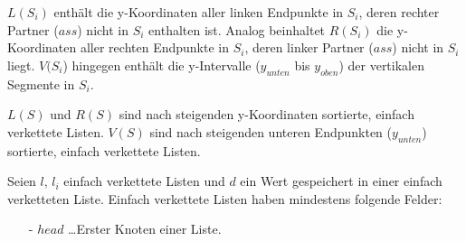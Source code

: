 \documentclass{article}
\begin{document}
$L(S_i)$ enth{\"a}lt die y-Koordinaten aller linken Endpunkte in $S_i$, deren
rechter Partner ($ass$) nicht in $S_i$ enthalten ist. Analog beinhaltet $R(S_i)$
die y-Koordinaten aller rechten Endpunkte in $S_i$, deren linker Partner ($ass$)
nicht in $S_i$ liegt. $V(S_i$) hingegen enth{\"a}lt die y-Intervalle ($y_{unten}$
bis $y_{oben}$) der vertikalen Segmente in $S_i$.

$L(S)$ und $R(S)$ sind nach steigenden y-Koordinaten sortierte, einfach verkettete
Listen. $V(S)$ sind nach steigenden unteren Endpunkten ($y_{unten}$) sortierte,
einfach verkettete Listen.

Seien $l$, $l_i$ einfach verkettete Listen und $d$ ein Wert gespeichert in einer
einfach verketteten Liste. Einfach verkettete Listen haben mindestens folgende
Felder:
\begin{itemize}
  \item[-] $head$ \ldots Erster Knoten einer Liste.
\end{itemize}
\end{document}
